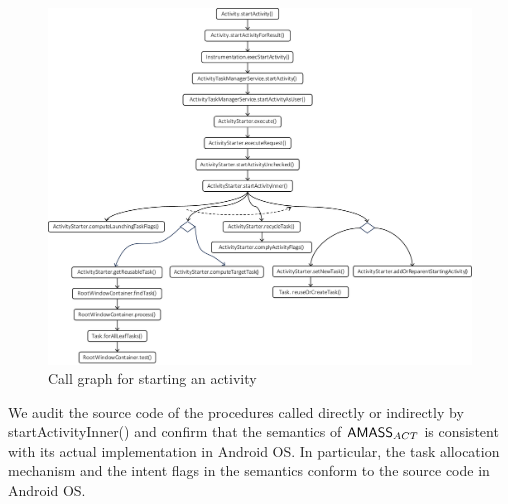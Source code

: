 \begin{figure}[htbp]
        \centering
        \includegraphics[scale = 0.55]{startActivity.pdf}
        \caption{Call graph for starting an activity}
    \label{fig:startActivity}
\end{figure}

We audit the source code of the procedures called directly or indirectly by startActivityInner() and confirm that the semantics of $\textsf{AMASS}_{ACT}$ is consistent with its actual implementation in Android OS. In particular, the task allocation mechanism and the intent flags in the semantics conform to the source code in Android OS.

